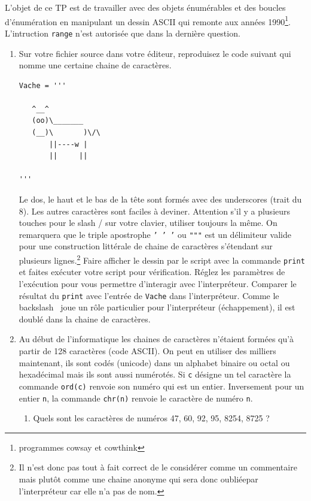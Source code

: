 L'objet de ce TP est de travailler avec des objets énumérables et des boucles d'énumération en manipulant un dessin ASCII qui remonte aux années 1990\footnote{programmes cowsay et cowthink}. L'intruction \texttt{range} n'est autorisée que dans la dernière question.
\begin{enumerate}
 \item Sur votre fichier source dans votre éditeur, reproduisez le code suivant qui nomme une certaine chaine de caractères.
\begin{verbatim}
Vache = '''
  
   ^__^             
   (oo)\_______     
   (__)\       )\/\ 
       ||----w |    
       ||     ||    
  
'''
\end{verbatim}
Le dos, le haut et le bas de la tête sont formés avec des underscores (trait du 8). Les autres caractères sont faciles à deviner. Attention s'il y a plusieurs touches pour le slash / sur votre clavier, utiliser toujours la même.\newline 
On remarquera que le triple apostrophe \texttt{' ' '} ou \texttt{"""} est un délimiteur valide pour une construction littérale de chaine de caractères s'étendant sur plusieurs lignes.\footnote{Il n'est donc pas tout à fait correct de le considérer comme un commentaire mais plutôt comme une chaine anonyme qui sera donc \og oubliée\fg par l'interpréteur car elle n'a pas de nom.}\newline
Faire afficher le dessin par le script avec la commande \texttt{print} et faites exécuter votre script pour vérification. Réglez les paramètres de l'exécution pour vous permettre d'interagir avec l'interpréteur. Comparer le résultat du \texttt{print} avec l'entrée de \texttt{Vache} dans l'interpréteur. Comme le backslash \ joue un rôle particulier pour l'interpréteur (échappement), il est doublé dans la chaine de caractères. 
\item Au début de l'informatique les chaines de caractères n'étaient formées qu'à partir de 128 caractères (code ASCII). On peut en utiliser des milliers maintenant, ils sont codés (unicode) dans un alphabet binaire ou octal ou hexadécimal mais ils sont aussi numérotés. Si \texttt{c} désigne un tel caractère la commande \texttt{ord(c)} renvoie son numéro qui est un entier.  Inversement pour un entier \texttt{n}, la commande \texttt{chr(n)} renvoie le caractère de numéro \texttt{n}.
\begin{enumerate}
 \item Quels sont les caractères de numéros 47, 60, 92, 95, 8254, 8725 ?

\end{enumerate}
\end{enumerate}
